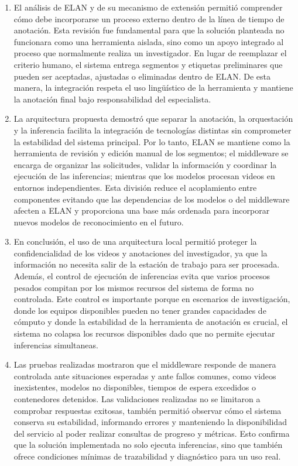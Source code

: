 \documentclass[11pt,a4paper]{article}
\begin{document}
\begin{enumerate}
    \item El análisis de ELAN y de su mecanismo de extensión permitió comprender cómo debe incorporarse un proceso externo dentro de la línea de tiempo de anotación. Esta revisión fue fundamental para que la solución planteada no funcionara como una herramienta aislada, sino como un apoyo integrado al proceso que normalmente realiza un investigador. En lugar de reemplazar el criterio humano, el sistema entrega segmentos y etiquetas preliminares que pueden ser aceptadas, ajustadas o eliminadas dentro de ELAN. De esta manera, la integración respeta el uso lingüístico de la herramienta y mantiene la anotación final bajo responsabilidad del especialista.

    \item La arquitectura propuesta demostró que separar la anotación, la orquestación y la inferencia facilita la integración de tecnologías distintas sin comprometer la estabilidad del sistema principal. Por lo tanto, ELAN se mantiene como la herramienta de revisión y edición manual de los segmentos; el middleware se encarga de organizar las solicitudes, validar la información y coordinar la ejecución de las inferencias; mientras que los modelos procesan videos en entornos independientes. Esta división reduce el acoplamiento entre componentes evitando que las dependencias de los modelos o del middleware afecten a ELAN y proporciona una base más ordenada para incorporar nuevos modelos de reconocimiento en el futuro.
    
    \item En conclusión, el uso de una arquitectura local permitió proteger la confidencialidad de los videos y anotaciones del investigador, ya que la información no necesita salir de la estación de trabajo para ser procesada. Además, el control de ejecución de inferencias evita que varios procesos pesados compitan por los mismos recursos del sistema de forma no controlada. Este control es importante porque en escenarios de investigación, donde los equipos disponibles pueden no tener grandes capacidades de cómputo y donde la estabilidad de la herramienta de anotación es crucial, el sistema no colapsa los recursos disponibles dado que no permite ejecutar inferencias simultaneas.

    \item Las pruebas realizadas mostraron que el middleware responde de manera controlada ante situaciones esperadas y ante fallos comunes, como videos inexistentes, modelos no disponibles, tiempos de espera excedidos o contenedores detenidos. Las validaciones realizadas no se limitaron a comprobar respuestas exitosas, también permitió observar cómo el sistema conserva su estabilidad, informando errores y manteniendo la disponibilidad del servicio al poder realizar consultas de progreso y métricas. Esto confirma que la solución implementada no solo ejecuta inferencias, sino que también ofrece condiciones mínimas de trazabilidad y diagnóstico para un uso real.


\end{enumerate}
\end{document}
